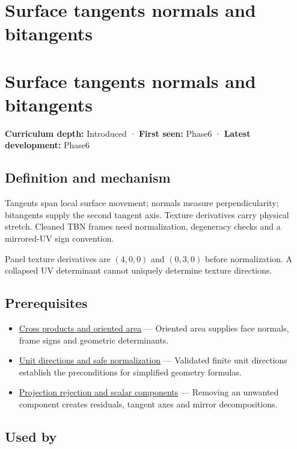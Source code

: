\hypertarget{appendix-e31893dec985}{}
\section*{Surface tangents normals and bitangents}
\section{Surface tangents normals and bitangents}\label{appendix-e31893dec985-surface-tangents-normals-and-bitangents}

\textbf{Curriculum depth:} Introduced · \textbf{First seen:} Phase6 · \textbf{Latest development:} Phase6

\subsection{Definition and mechanism}\label{appendix-e31893dec985-definition-and-mechanism}

Tangents span local surface movement; normals measure perpendicularity; bitangents supply the second tangent axis. Texture derivatives carry physical stretch. Cleaned TBN frames need normalization, degeneracy checks and a mirrored-UV sign convention.

Panel texture derivatives are \((4,0,0)\) and \((0,3,0)\) before normalization. A collapsed UV determinant cannot uniquely determine texture directions.

\subsection{Prerequisites}\label{appendix-e31893dec985-prerequisites}

\begin{itemize}
\tightlist
\item
  \hyperref[appendix-2391db8052b1]{Cross products and oriented area} --- Oriented area supplies face normals, frame signs and geometric determinants.
\item
  \hyperref[appendix-f744e41b95b4]{Unit directions and safe normalization} --- Validated finite unit directions establish the preconditions for simplified geometry formulas.
\item
  \hyperref[appendix-505a502c372a]{Projection rejection and scalar components} --- Removing an unwanted component creates residuals, tangent axes and mirror decompositions.
\end{itemize}

\subsection{Used by}\label{appendix-e31893dec985-used-by}

